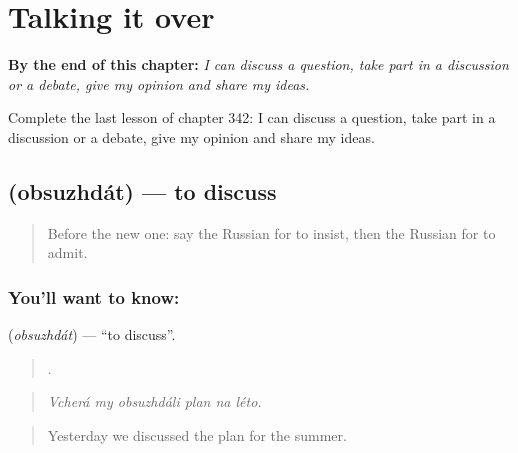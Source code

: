
\chapter{Talking it over}
\label{ch:ru-talking-it-over}

\begin{chapteropening}
\textbf{By the end of this chapter:} \emph{I can discuss a question, take part in a discussion or a debate, give my opinion and share my ideas.}

Complete the last lesson of chapter 342: I can discuss a question, take part in a discussion or a debate, give my opinion and share my ideas.
\end{chapteropening}

\section[\texorpdfstring{\ru{обсуждать} (obsuzhdát)}{обсуждать (obsuzhdát)}]{ (obsuzhdát) — to discuss}

\label{lesson:RU-C342-obsuzhdat}



\begin{quote}
Before the new one: say the Russian for to insist, then the Russian for to admit.
\end{quote}

\subsection*{You'll want to know: }
\textbf{} (\emph{obsuzhdát}) — \textquotedblleft{}to discuss\textquotedblright{}.

\begin{quote}
     .
\end{quote}

\begin{quote}
\emph{Vcherá my obsuzhdáli plan na léto.}
\end{quote}

\begin{quote}
Yesterday we discussed the plan for the summer.
\end{quote}

